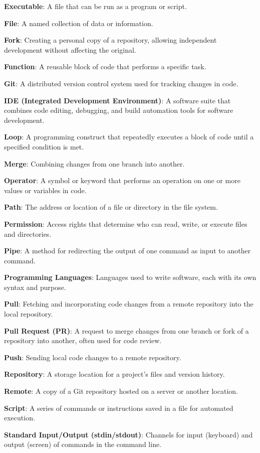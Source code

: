 \documentclass[9pt]{cheatsheet}
\begin{document}
\begin{multicols*}{3}
\textbf{Executable}: A file that can be run as a program or script.

\textbf{File}: A named collection of data or information.

\textbf{Fork}: Creating a personal copy of a repository, allowing independent development without affecting the original.

\textbf{Function}: A reusable block of code that performs a specific task.

\textbf{Git}: A distributed version control system used for tracking changes in code.

\textbf{IDE (Integrated Development Environment)}: A software suite that combines code editing, debugging, and build automation tools for software development.

\textbf{Loop}: A programming construct that repeatedly executes a block of code until a specified condition is met.

\textbf{Merge}: Combining changes from one branch into another.

\textbf{Operator}: A symbol or keyword that performs an operation on one or more values or variables in code.

\textbf{Path}: The address or location of a file or directory in the file system.

\textbf{Permission}: Access rights that determine who can read, write, or execute files and directories.

\textbf{Pipe}: A method for redirecting the output of one command as input to another command.

\textbf{Programming Languages}: Languages used to write software, each with its own syntax and purpose.

\textbf{Pull}: Fetching and incorporating code changes from a remote repository into the local repository.

\textbf{Pull Request (PR)}: A request to merge changes from one branch or fork of a repository into another, often used for code review.

\textbf{Push}: Sending local code changes to a remote repository.

\textbf{Repository}: A storage location for a project's files and version history.

\textbf{Remote}: A copy of a Git repository hosted on a server or another location.

\textbf{Script}: A series of commands or instructions saved in a file for automated execution.

\textbf{Standard Input/Output (stdin/stdout)}: Channels for input (keyboard) and output (screen) of commands in the command line.


\end{multicols*}
\end{document}
